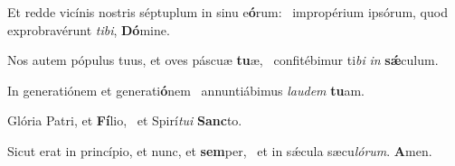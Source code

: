 \item Et redde vicínis nostris séptuplum in sinu e\textbf{ó}rum:~\psstar{} impropérium ipsórum, quod exprobravérunt \textit{tibi}, \textbf{Dó}mine.

\item Nos autem pópulus tuus, et oves páscuæ \textbf{tu}æ,~\psstar{} confitébimur ti\textit{bi} \textit{in} \textbf{sǽ}culum.

\item In generatiónem et generati\textbf{ó}nem~\psstar{} annuntiábimus \textit{laudem} \textbf{tu}am.

\item Glória Patri, et \textbf{Fí}lio,~\psstar{} et Spirí\textit{tui} \textbf{Sanc}to.

\item Sicut erat in princípio, et nunc, et \textbf{sem}per,~\psstar{} et in sǽcula sæcu\textit{lórum}. \textbf{A}men.